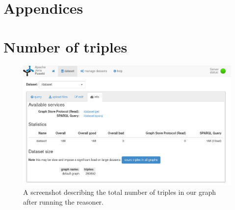 \chapter*{Appendices}
\appendix

\chapter{Number of triples}
\label{appendix:triples}
\begin{figure}[H]
	\centering
	\includegraphics[width=\linewidth]{figures/triples.png}
	\caption{A screenshot describing the total number of triples in our graph after running the reasoner.}
\end{figure}

